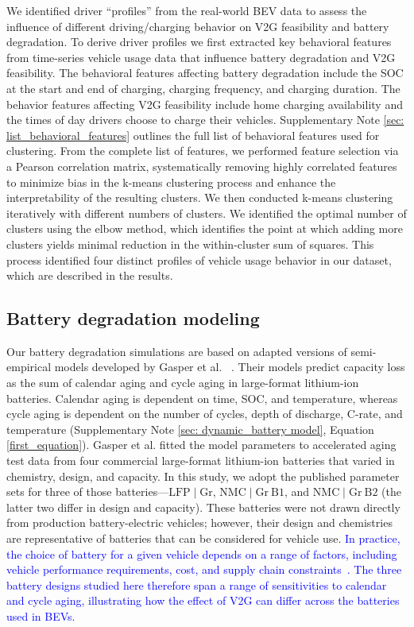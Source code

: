 \documentclass[pdflatex,sn-nature]{sn-jnl}%
\theoremstyle{thmstyleone}%
\theoremstyle{thmstyletwo}%
\theoremstyle{thmstylethree}%
\begin{document}
We identified driver ``profiles'' from the real-world BEV data to assess the influence of different driving/charging behavior on V2G feasibility and battery degradation. To derive driver profiles we first extracted key behavioral features from time-series vehicle usage data that influence battery degradation and V2G feasibility. The behavioral features affecting battery degradation include the SOC at the start and end of charging, charging frequency, and charging duration. The behavior features affecting V2G feasibility include home charging availability and the times of day drivers choose to charge their vehicles. Supplementary Note  \ref{sec: list_behavioral_features} outlines the full list of behavioral features used for clustering. From the complete list of features, we performed feature selection via a Pearson correlation matrix, systematically removing highly correlated features to minimize bias in the k-means clustering process and enhance the interpretability of the resulting clusters. We then conducted k-means clustering~\cite{k_means_citation} iteratively with different numbers of clusters. We identified the optimal number of clusters using the elbow method, which identifies the point at which adding more clusters yields minimal reduction in the within-cluster sum of squares. This process identified four distinct profiles of vehicle usage behavior in our dataset, which are described in the results. 



\subsection{Battery degradation modeling}
\label{subsec:battery_model}
Our battery degradation simulations are based on adapted versions of semi-empirical models developed by Gasper et al. ~\cite{gasper2023degradation}. Their models predict capacity loss as the sum of calendar aging and cycle aging in large-format lithium-ion batteries. Calendar aging is dependent on time, SOC, and temperature, whereas cycle aging is dependent on the number of cycles, depth of discharge, C-rate, and temperature (Supplementary Note \ref{sec: dynamic_battery model}, Equation \ref{first_equation}). Gasper et al. fitted the model parameters to accelerated aging test data from four commercial large-format lithium-ion batteries that varied in chemistry, design, and capacity. In this study, we adopt the published parameter sets for three of those batteries—$\mathrm{LFP}\mid\mathrm{Gr}$, $\mathrm{NMC}\mid\mathrm{Gr~B1}$, and $\mathrm{NMC}\mid\mathrm{Gr~B2}$ (the latter two differ in design and capacity). These batteries were not drawn directly from production battery-electric vehicles; however, their design and chemistries are representative of batteries that can be considered for vehicle use. \textcolor{blue}{In practice, the choice of battery for a given vehicle depends on a range of factors, including vehicle performance requirements, cost, and supply chain constraints~\cite{Olivetti2017}. The three battery designs studied here therefore span a range of sensitivities to calendar and cycle aging, illustrating how the effect of V2G can differ across the batteries used in BEVs.}
\end{document}
